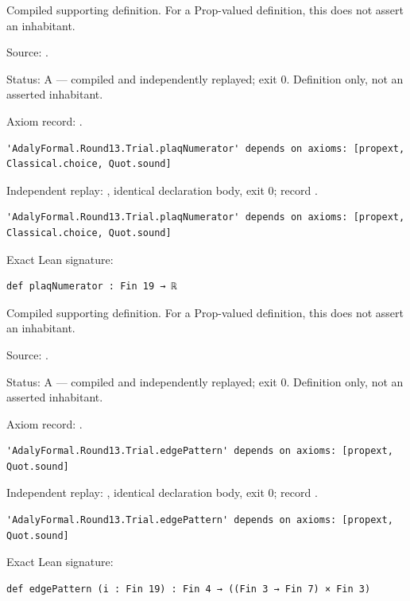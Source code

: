 \begin{definition}[bp-420]
\label{bp-420}
\uses{}
\leanok
Compiled supporting definition. For a Prop-valued definition, this does not assert an inhabitant.

\par Source: \texttt{}.
\par Status: A — compiled and independently replayed; exit 0. Definition only, not an asserted inhabitant.
\par Axiom record: \texttt{}.
\begin{verbatim}
'AdalyFormal.Round13.Trial.plaqNumerator' depends on axioms: [propext, Classical.choice, Quot.sound]
\end{verbatim}
\par Independent replay: \texttt{}, identical declaration body, exit 0; record \texttt{}.
\begin{verbatim}
'AdalyFormal.Round13.Trial.plaqNumerator' depends on axioms: [propext, Classical.choice, Quot.sound]
\end{verbatim}
\par Exact Lean signature:
\begin{verbatim}
def plaqNumerator : Fin 19 → ℝ
\end{verbatim}
\end{definition}

\begin{definition}[bp-421]
\label{bp-421}
\leanok
Compiled supporting definition. For a Prop-valued definition, this does not assert an inhabitant.

\par Source: \texttt{}.
\par Status: A — compiled and independently replayed; exit 0. Definition only, not an asserted inhabitant.
\par Axiom record: \texttt{}.
\begin{verbatim}
'AdalyFormal.Round13.Trial.edgePattern' depends on axioms: [propext, Quot.sound]
\end{verbatim}
\par Independent replay: \texttt{}, identical declaration body, exit 0; record \texttt{}.
\begin{verbatim}
'AdalyFormal.Round13.Trial.edgePattern' depends on axioms: [propext, Quot.sound]
\end{verbatim}
\par Exact Lean signature:
\begin{verbatim}
def edgePattern (i : Fin 19) : Fin 4 → ((Fin 3 → Fin 7) × Fin 3)
\end{verbatim}
\end{definition}


